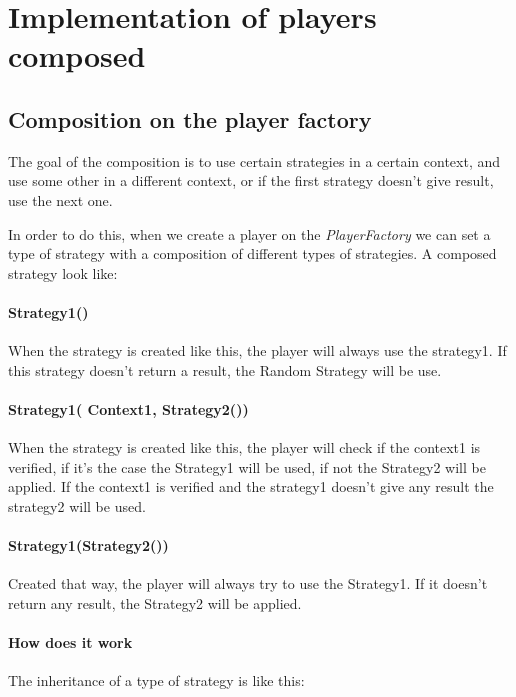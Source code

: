         \section{Implementation of players composed}
        
        \subsection{Composition on the player factory}
                
            The goal of the composition is to use certain strategies in a certain context, and use some other in a different context, or if the first strategy doesn't give result, use the next one.
            
            In order to do this, when we create a player on the \textit{PlayerFactory} we can set a type of strategy with a composition of different types of strategies.
            A composed strategy look like:

            
            \paragraph{Strategy1()}
                When the strategy is created like this, the player will always use the strategy1.
                If this strategy doesn't return a result, the Random Strategy will be use.
            
            \paragraph{Strategy1( Context1, Strategy2())}
                When the strategy is created like this, the player will check if the context1 is verified, if it's the case the Strategy1 will be used, if not the Strategy2 will be applied.
                If the context1 is verified and the strategy1 doesn't give any result the strategy2 will be used.
            
            \paragraph{Strategy1(Strategy2())}
                Created that way, the player will always try to use the Strategy1. If it doesn't return any result, the Strategy2 will be applied.
            
            \paragraph{How does it work}
            The inheritance of a type of strategy is like this:
            
